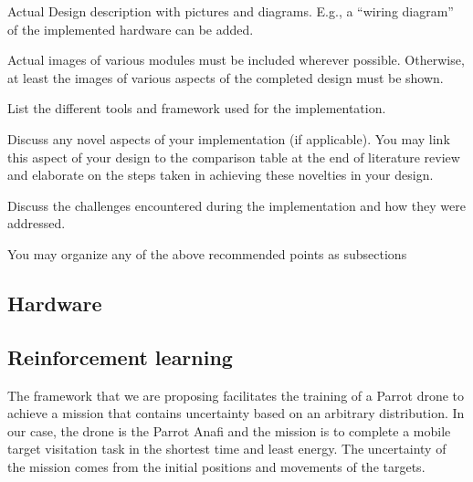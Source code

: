 \documentclass[../main.tex]{subfiles}
\begin{document}
\begin{newrequirements}
    \begin{todolist}
    \item Actual Design description with pictures 
        and diagrams. E.g., a “wiring diagram” 
        of the implemented hardware can be 
        added. 

    \item Actual images of various modules must 
        be included wherever possible. 
        Otherwise, at least the images of 
        various aspects of the completed design 
        must be shown. 

    \item List the different tools and framework 
        used for the implementation. 

    \item Discuss any novel aspects of your 
        implementation (if applicable). You may 
        link this aspect of your design to the 
        comparison table at the end of 
        literature review and elaborate on the 
        steps taken in achieving these 
        novelties in your design. 

    \item Discuss the challenges encountered 
        during the implementation and how they 
        were addressed. 

    \item You may organize any of the above 
        recommended points as subsections 

    \end{todolist}
\end{newrequirements}

\subsection{Hardware}

\lipsum[1]

\subsection{Reinforcement learning}

The framework that we are proposing facilitates the training of
a Parrot drone to achieve a mission that contains uncertainty
based on an arbitrary distribution. 
In our case, the drone is the Parrot Anafi and 
the mission is to complete a 
mobile target visitation task 
in the shortest time and least energy.
The uncertainty of the mission comes from the initial positions and 
movements of the targets.
\end{document}
